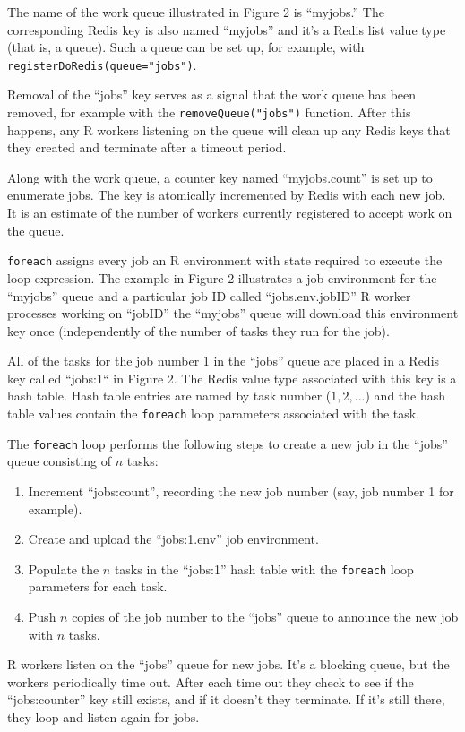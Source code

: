 \documentclass[12pt]{article}
\begin{document}
The name of the work queue illustrated in Figure 2 is ``myjobs.'' The
corresponding Redis key is also named ``myjobs'' and it's a Redis list value type
(that is, a queue).  Such a queue can be set up, for example, with
\verb+registerDoRedis(queue="jobs")+.

Removal of the ``jobs'' key serves as a signal that the work queue has been
removed, for example with the \verb+removeQueue("jobs")+ function. After this
happens, any R workers listening on the queue will clean up any Redis keys that
they created and terminate after a timeout period.

Along with the work queue, a counter key named ``myjobs.count'' is set up to
enumerate jobs. The key is atomically incremented by Redis with each new job.
It is an estimate of the number of workers currently registered to accept work
on the queue.

\verb+foreach+ assigns every job an R environment with state required to
execute the loop expression. The example in Figure 2 illustrates a job
environment for the ``myjobs'' queue and a particular job ID called
``jobs.env.jobID'' R worker processes working on ``jobID'' the ``myjobs'' queue
will download this environment key once (independently of the number of tasks
they run for the job).

All of the tasks for the job number 1 in the ``jobs'' queue are placed in a
Redis key called ``jobs:1`` in Figure 2. The Redis value type associated with
this key is a hash table. Hash table entries are named by task number ($1, 2,
...$) and the hash table values contain the \verb+foreach+ loop parameters
associated with the task.

The \verb+foreach+ loop performs the following steps to create a new job
in the ``jobs'' queue consisting of $n$ tasks:
\begin{enumerate}
\item Increment ``jobs:count'', recording the new job number
       (say, job number 1 for example).
\item Create and upload the  ``jobs:1.env'' job environment.
\item Populate the $n$ tasks in the ``jobs:1'' hash table with the
      \verb+foreach+ loop parameters for each task.
\item Push $n$ copies of the job number to the ``jobs'' queue to announce
  the new job with $n$ tasks.
\end{enumerate}

R workers listen on the ``jobs'' queue for new jobs. It's a blocking queue, but
the workers periodically time out. After each time out they check to see if the
``jobs:counter'' key still exists, and if it doesn't they terminate. If it's
still there, they loop and listen again for jobs.
\end{document}
